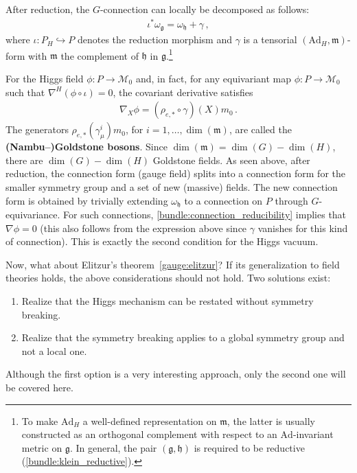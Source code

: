     After reduction, the $G$-connection can locally be decomposed as follows:
    \begin{gather}
        \iota^*\omega_{\mathfrak{g}} = \omega_{\mathfrak{h}} + \gamma\,,
    \end{gather}
    where $\iota:P_H\hookrightarrow P$ denotes the reduction morphism and $\gamma$ is a tensorial $(\mathrm{Ad}_H,\mathfrak{m})$-form with $\mathfrak{m}$ the complement of $\mathfrak{h}$ in $\mathfrak{g}$.\footnote{To make $\mathrm{Ad}_H$ a well-defined representation on $\mathfrak{m}$, the latter is usually constructed as an orthogonal complement with respect to an $\mathrm{Ad}$-invariant metric on $\mathfrak{g}$. In general, the pair $(\mathfrak{g},\mathfrak{h})$ is required to be reductive (\cref{bundle:klein_reductive}).}

    For the Higgs field $\phi:P\rightarrow\mathcal{M}_0$ and, in fact, for any equivariant map $\phi:P\rightarrow\mathcal{M}_0$ such that $\nabla^H(\phi\circ\iota)=0$, the covariant derivative satisfies
    \begin{gather}
        \nabla_X\phi = (\rho_{e,\ast}\circ\gamma)(X)m_0\,.
    \end{gather}
    The generators $\rho_{e,\ast}(\gamma^i_\mu)m_0$, for $i=1,\ldots,\dim(\mathfrak{m})$, are called the \textbf{(Nambu--)Goldstone bosons}. Since $\dim(\mathfrak{m})=\dim(G)-\dim(H)$, there are $\dim(G)-\dim(H)$ Goldstone fields. As seen above, after reduction, the connection form (gauge field) splits into a connection form for the smaller symmetry group and a set of new (massive) fields. The new connection form is obtained by trivially extending $\omega_{\mathfrak{h}}$ to a connection on $P$ through $G$-equivariance. For such connections, \cref{bundle:connection_reducibility} implies that $\nabla\phi=0$ (this also follows from the expression above since $\gamma$ vanishes for this kind of connection). This is exactly the second condition for the Higgs vacuum.

    Now, what about Elitzur's theorem~\ref{gauge:elitzur}? If its generalization to field theories holds, the above considerations should not hold. Two solutions exist:
    \begin{enumerate}
        \item Realize that the Higgs mechanism can be restated without symmetry breaking.
        \item Realize that the symmetry breaking applies to a global symmetry group and not a local one.
    \end{enumerate}
    Although the first option is a very interesting approach, only the second one will be covered here. 


